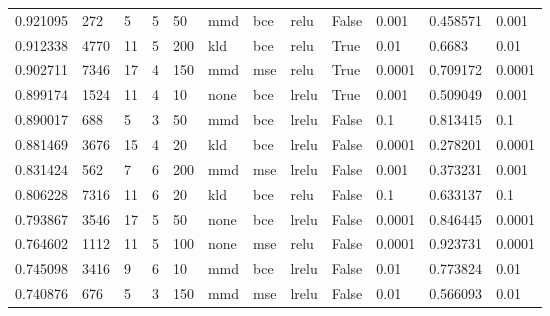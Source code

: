 \begin{longtable}{llllllllllll}
       0.921095 &          272 &              5 &        5 &               50 &         mmd &                 bce &                relu &     False &   0.001 &  0.458571 &   0.001 \\
       0.912338 &         4770 &             11 &        5 &              200 &         kld &                 bce &                relu &      True &    0.01 &    0.6683 &    0.01 \\
       0.902711 &         7346 &             17 &        4 &              150 &         mmd &                 mse &                relu &      True &  0.0001 &  0.709172 &  0.0001 \\
       0.899174 &         1524 &             11 &        4 &               10 &        none &                 bce &               lrelu &      True &   0.001 &  0.509049 &   0.001 \\
       0.890017 &          688 &              5 &        3 &               50 &         mmd &                 bce &               lrelu &     False &     0.1 &  0.813415 &     0.1 \\
       0.881469 &         3676 &             15 &        4 &               20 &         kld &                 bce &               lrelu &     False &  0.0001 &  0.278201 &  0.0001 \\
       0.831424 &          562 &              7 &        6 &              200 &         mmd &                 mse &               lrelu &     False &   0.001 &  0.373231 &   0.001 \\
       0.806228 &         7316 &             11 &        6 &               20 &         kld &                 bce &                relu &     False &     0.1 &  0.633137 &     0.1 \\
       0.793867 &         3546 &             17 &        5 &               50 &        none &                 bce &               lrelu &     False &  0.0001 &  0.846445 &  0.0001 \\
       0.764602 &         1112 &             11 &        5 &              100 &        none &                 mse &                relu &     False &  0.0001 &  0.923731 &  0.0001 \\
       0.745098 &         3416 &              9 &        6 &               10 &         mmd &                 bce &               lrelu &     False &    0.01 &  0.773824 &    0.01 \\
       0.740876 &          676 &              5 &        3 &              150 &         mmd &                 mse &               lrelu &     False &    0.01 &  0.566093 &    0.01 \\

\end{longtable}
